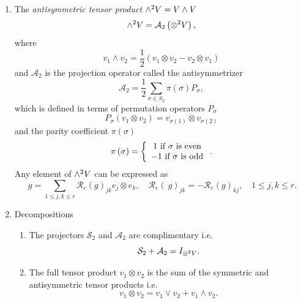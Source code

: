 \documentclass[aps,preprint]{revtex4}%
\begin{document}
\begin{enumerate}
\item The \emph{antisymmetric tensor product} ${\huge \wedge}^{2}V=V\wedge V$%
\begin{equation}
{\huge \wedge}^{2}V=\mathcal{A}_{2}\left(  {\Large \otimes}^{2}V\right)  ,
\end{equation}
where
\begin{equation}
v_{1}\wedge v_{2}=\frac{1}{2}\left(  v_{1}\otimes v_{2}-v_{2}\otimes
v_{1}\right)
\end{equation}
and $\mathcal{A}_{2}$ is the projection operator called the antisymmetrizer
\begin{equation}
\mathcal{A}_{2}=\frac{1}{2}\sum_{\sigma\in S_{2}}\pi\left(  \sigma\right)
P_{\sigma},
\end{equation}
which is defined in terms of permutation operators $P_{\sigma}$
\begin{equation}
P_{\sigma}\left(  v_{1}\otimes v_{2}\right)  =v_{\sigma\left(  1\right)
}\otimes v_{\sigma\left(  2\right)  }%
\end{equation}
and the parity coefficient $\pi\left(  \sigma\right)  $
\begin{equation}
\pi\left(  \sigma\right)  =\left\{
\begin{array}
[c]{c}%
1\text{ if }\sigma\text{ is even}\\
-1\text{ if }\sigma\text{ is odd}%
\end{array}
\right.  .
\end{equation}
Any element of ${\huge \wedge}^{2}V$ can be expressed as
\begin{equation}
\ g=\sum_{1\leq j,k\leq r}\mathcal{R}_{e}\left(  g\right)  _{jk}e_{j}\otimes
e_{k},\quad\mathcal{R}_{e}\left(  \ g\right)  _{jk}=-\mathcal{R}_{e}\left(
g\right)  _{kj},\quad1\leq j,k\leq r.
\end{equation}


\item Decompositions

\begin{enumerate}
\item The projectors $\mathcal{S}_{2}$ and $\mathcal{A}_{2}$ are complimentary
i.e.
\begin{equation}
\mathcal{S}_{2}+\mathcal{A}_{2}=I_{{\Large \otimes}^{2}V}.
\end{equation}


\item The full tensor product $v_{1}\otimes v_{2}$ is the sum of the symmetric
and antisymmetric tensor products i.e.
\begin{equation}
v_{1}\otimes v_{2}=v_{1}\vee v_{2}+v_{1}\wedge v_{2}.
\end{equation}



\end{enumerate}
\end{enumerate}
\end{document}
